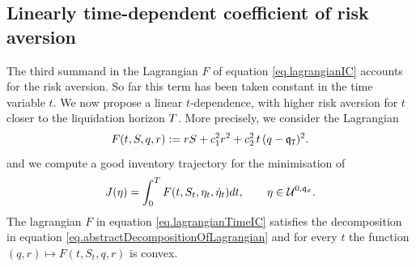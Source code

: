 \documentclass[10pt,a4paper]{article}
\begin{document}
	\subsection{Linearly time-dependent coefficient of risk aversion}\label{sec.timeIC}
	The third summand in the Lagrangian $F$ of equation \eqref{eq.lagrangianIC} accounts for the risk aversion. So far this term has been taken constant in the time variable $t$. We now propose a linear $t$-dependence, with higher risk aversion for $t$ closer to the liquidation horizon $T$. More precisely, we consider the Lagrangian
	\begin{equation}\label{eq.lagrangianTimeIC}
	F(t,S,q,r):= rS + c_{1}^{2} r^{2} +c_{2}^{2} \, t \,  (q-\mathfrak{q}_{\mathtt{T} })^{2}.
	\end{equation}
	and we compute a good inventory trajectory for the minimisation of 
	\begin{equation*}\label{eq.costFunctionalTimeIC}
	J(\eta)=\int_{0}^{T} F (t,S_t,\eta_t,\dot{\eta}_t) dt, \qquad \eta \in \mathcal{U}^{0,\mathfrak{q_0}}.
	\end{equation*}
	The lagrangian $F$ in equation \eqref{eq.lagrangianTimeIC} satisfies the decomposition in equation \eqref{eq.abstractDecompositionOfLagrangian} and for every $t$ the function $(q,r)\mapsto F(t,S_t,q,r)$ is convex. 
	
\end{document}
